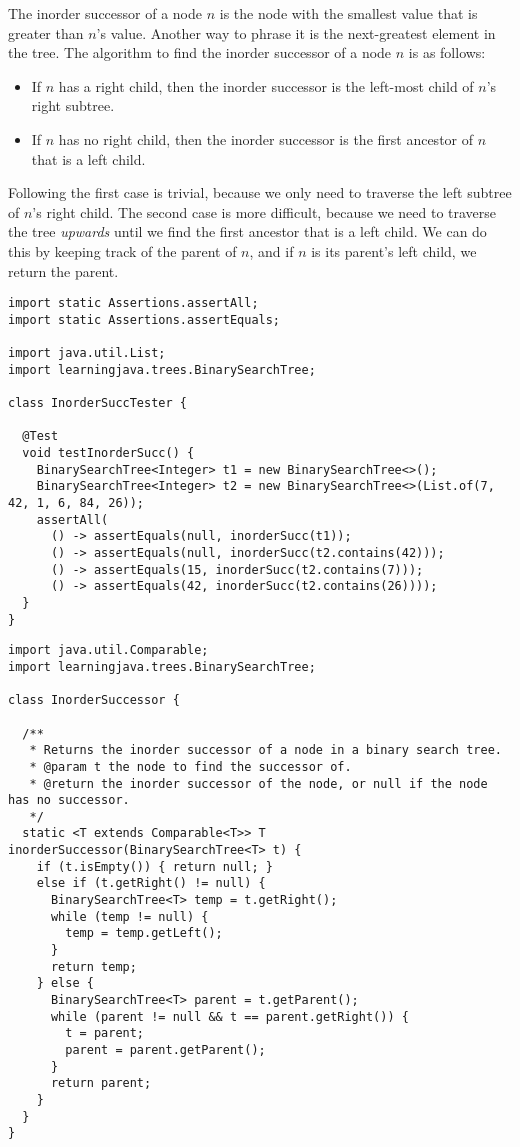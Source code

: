 The inorder successor of a node $n$ is the node with the smallest value that is greater than $n$'s value. 
Another way to phrase it is the next-greatest element in the tree.
The algorithm to find the inorder successor of a node $n$ is as follows:
\begin{itemize}
  \item If $n$ has a right child, then the inorder successor is the left-most child of $n$'s right subtree.
  \item If $n$ has no right child, then the inorder successor is the first ancestor of $n$ that is a left child.
\end{itemize}
Following the first case is trivial, because we only need to traverse the left subtree of $n$'s right child. 
The second case is more difficult, because we need to traverse the tree \emph{upwards} until we find the first ancestor that is a left child. 
We can do this by keeping track of the parent of $n$, and if $n$ is its parent's left child, we return the parent.

\begin{lstlisting}[language=MyJava]
import static Assertions.assertAll;
import static Assertions.assertEquals;

import java.util.List;
import learningjava.trees.BinarySearchTree;

class InorderSuccTester {

  @Test
  void testInorderSucc() {
    BinarySearchTree<Integer> t1 = new BinarySearchTree<>();
    BinarySearchTree<Integer> t2 = new BinarySearchTree<>(List.of(7, 42, 1, 6, 84, 26));
    assertAll(
      () -> assertEquals(null, inorderSucc(t1));
      () -> assertEquals(null, inorderSucc(t2.contains(42)));
      () -> assertEquals(15, inorderSucc(t2.contains(7)));
      () -> assertEquals(42, inorderSucc(t2.contains(26))));
  }
}
\end{lstlisting}

\begin{lstlisting}[language=MyJava]
import java.util.Comparable;
import learningjava.trees.BinarySearchTree;

class InorderSuccessor {

  /**
   * Returns the inorder successor of a node in a binary search tree.
   * @param t the node to find the successor of.
   * @return the inorder successor of the node, or null if the node has no successor.
   */
  static <T extends Comparable<T>> T inorderSuccessor(BinarySearchTree<T> t) {
    if (t.isEmpty()) { return null; } 
    else if (t.getRight() != null) {
      BinarySearchTree<T> temp = t.getRight();
      while (temp != null) {
        temp = temp.getLeft();
      }
      return temp;
    } else {
      BinarySearchTree<T> parent = t.getParent();
      while (parent != null && t == parent.getRight()) {
        t = parent;
        parent = parent.getParent();
      }
      return parent;
    }
  }
}
\end{lstlisting}

